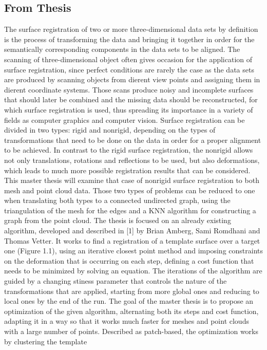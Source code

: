 \documentclass[../structure.tex]{subfiles}
\begin{document}
\subsection{From Thesis}
	The surface registration of two or more three-dimensional data sets by definition
is the process of transforming the data and bringing it together in
order for the semantically corresponding components in the data sets to be
aligned. The scanning of three-dimensional object often gives occasion for the application of surface registration, since perfect conditions are rarely the case as the data sets are produced by scanning objects from dierent view
points and assigning them in dierent coordinate systems. Those scans produce
noisy and incomplete surfaces that should later be combined and the
missing data should be reconstructed, for which surface registration is used,
thus spreading its importance in a variety of fields as computer graphics and
computer vision.
Surface registration can be divided in two types: rigid and nonrigid, depending
on the types of transformations that need to be done on the data in
order for a proper alignment to be achieved. In contrast to the rigid surface
registration, the nonrigid allows not only translations, rotations and reflections
to be used, but also deformations, which leads to much more possible
registration results that can be considered.
This master thesis will examine that case of nonrigid surface registration
to both mesh and point cloud data. Those two types of problems can be
reduced to one when translating both types to a connected undirected graph,
using the triangulation of the mesh for the edges and a KNN algorithm for
constructing a graph from the point cloud. The thesis is focused on an already
existing algorithm, developed and described in [1] by Brian Amberg, Sami
Romdhani and Thomas Vetter. It works to find a registration of a template
surface over a target one (Figure 1.1), using an iterative closest point method
and imposing constraints on the deformation that is occurring on each step,
defining a cost function that needs to be minimized by solving an equation.
The iterations of the algorithm are guided by a changing stiness parameter
that controls the nature of the transformations that are applied, starting
from more global ones and reducing to local ones by the end of the run. The
goal of the master thesis is to propose an optimization of the given algorithm,
alternating both its steps and cost function, adapting it in a way so that it
works much faster for meshes and point clouds with a large number of points.
Described as patch-based, the optimization works by clustering the template
\end{document}
